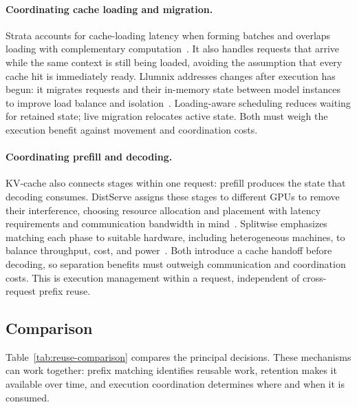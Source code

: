 \paragraph{Coordinating cache loading and migration.}
Strata accounts for cache-loading latency when forming batches and overlaps loading with complementary computation~\cite{kv_xie2026strata}. It also handles requests that arrive while the same context is still being loaded, avoiding the assumption that every cache hit is immediately ready. Llumnix addresses changes after execution has begun: it migrates requests and their in-memory state between model instances to improve load balance and isolation~\cite{kv_sun2024llumnix}. Loading-aware scheduling reduces waiting for retained state; live migration relocates active state. Both must weigh the execution benefit against movement and coordination costs.

\paragraph{Coordinating prefill and decoding.}
KV-cache also connects stages within one request: prefill produces the state that decoding consumes. DistServe assigns these stages to different GPUs to remove their interference, choosing resource allocation and placement with latency requirements and communication bandwidth in mind~\cite{kv_zhong2024distserve}. Splitwise emphasizes matching each phase to suitable hardware, including heterogeneous machines, to balance throughput, cost, and power~\cite{kv_patel2024splitwise}. Both introduce a cache handoff before decoding, so separation benefits must outweigh communication and coordination costs. This is execution management within a request, independent of cross-request prefix reuse.

\subsection{Comparison}\label{sec:techniques:reuse-summary}

Table~\ref{tab:reuse-comparison} compares the principal decisions. These mechanisms can work together: prefix matching identifies reusable work, retention makes it available over time, and execution coordination determines where and when it is consumed.

